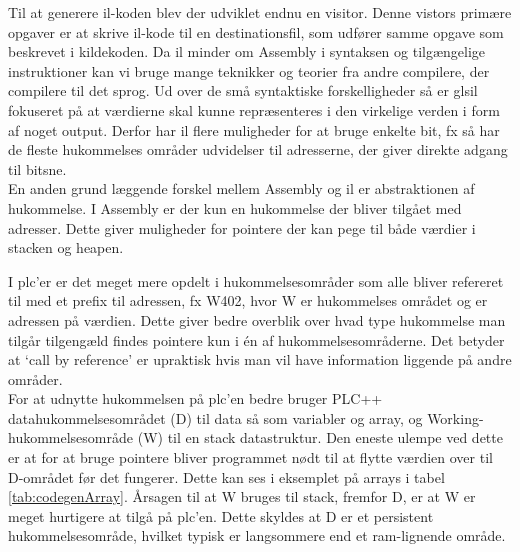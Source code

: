 Til at generere \gls{il}-koden blev der udviklet endnu en visitor. Denne vistors primære opgaver er at skrive \gls{il}-kode til en destinationsfil, som udfører samme opgave som beskrevet i kildekoden. Da \gls{il} minder om Assembly i syntaksen og tilgængelige instruktioner kan vi bruge mange teknikker og teorier fra andre compilere, der compilere til det sprog. Ud over de små syntaktiske forskelligheder så er gls{il} fokuseret på at værdierne skal kunne repræsenteres i den virkelige verden i form af noget output. Derfor har \gls{il} flere muligheder for at bruge enkelte bit, fx så har de fleste hukommelses områder udvidelser til adresserne, der giver direkte adgang til bitsne. \\

\noindent En anden grund læggende forskel mellem Assembly og \gls{il} er abstraktionen af hukommelse. I Assembly er der kun en hukommelse der bliver tilgået med adresser. Dette giver muligheder for pointere der kan pege til både værdier i stacken og heapen.

\noindent I \gls{plc}'er er det meget mere opdelt i hukommelsesområder som alle bliver refereret til med et prefix til adressen, fx {\ttfamily W402}, hvor {\ttfamily W} er hukommelses området og {} er adressen på værdien. Dette giver bedre overblik over hvad type hukommelse man tilgår tilgengæld findes pointere kun i én af hukommelsesområderne. Det betyder at \enquote*{call by reference} er upraktisk hvis man vil have information liggende på andre områder.\\

\noindent For at udnytte hukommelsen på \gls{plc}'en bedre bruger PLC++ datahukommelsesområdet ({\ttfamily D}) til data så som variabler og array, og Working-hukommelsesområde ({\ttfamily W}) til en stack datastruktur. Den eneste ulempe ved dette er at for at bruge pointere bliver programmet nødt til at flytte værdien over til {\ttfamily D}-området før det fungerer. Dette kan ses i eksemplet på arrays i tabel \ref{tab:codegenArray}. Årsagen til at {\ttfamily W} bruges til stack, fremfor {\ttfamily D}, er at {\ttfamily W} er meget hurtigere at tilgå på \gls{plc}'en. Dette skyldes at {\ttfamily D} er et persistent hukommelsesområde, hvilket typisk er langsommere end et ram-lignende område.